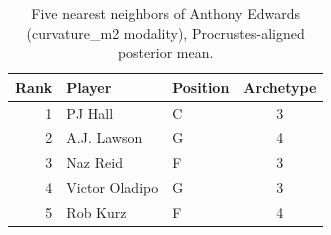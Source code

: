 \begin{table}[htbp]
  \centering\small
  \begin{tabular}{rllc}
    \toprule
    Rank & Player & Position & Archetype \\
    \midrule
    1 & PJ Hall & C & 3 \\
    2 & A.J. Lawson & G & 4 \\
    3 & Naz Reid & F & 3 \\
    4 & Victor Oladipo & G & 3 \\
    5 & Rob Kurz & F & 4 \\
    \bottomrule
  \end{tabular}
  \caption{Five nearest neighbors of Anthony Edwards (curvature_m2 modality), Procrustes-aligned posterior mean.}
  \label{tab:Anthony_Edwards_neighbors_curvature_m2}
\end{table}

